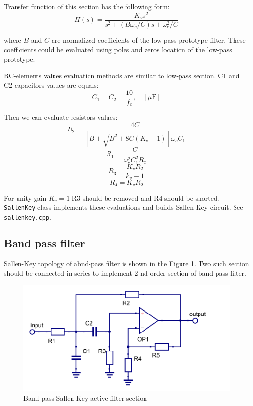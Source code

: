 Transfer function of this section has the following form:
\begin{equation}
 H(s)=\frac{K_vs^2}{s^2+(B\omega_c/C)s+\omega_c^2/C} \label{sk-hpf-trfunc}
\end{equation}

where $B$ and $C$ are normalized coefficients of the low-pass prototype filter.
These coefficients could be evaluated using poles and zeros location of the
low-pass prototype.

RC-elements values evaluation methods are similar to low-pass section. C1 and
C2 capacitors values are equals:
\begin{equation}
 C_1=C_2=\frac{10}{f_c}, \quad [\mu\mbox{F}]
\end{equation}

Then we can evaluate resistors values:
\begin{equation}
 R_2=\frac{4C}{[B+\sqrt{B^2+8C(K_v-1)}]\omega_cC_1}
\end{equation}
\begin{equation}
 R_1=\frac{C}{\omega_c^2C_1^2R_2}
\end{equation}
\begin{equation}
 R_3=\frac{K_vR_2}{k_v-1}
\end{equation}
\begin{equation}
 R_4=K_vR_2
\end{equation}


For unity gain $K_v=1$ R3 should be removed and R4 should be shorted.
\verb|SallenKey| class implements these evaluations and builds Sallen-Key
circuit. See \verb|sallenkey.cpp|.

\subsection{Band pass filter}

Sallen-Key topology of abnd-pass filter is shown in the Figure
\ref{fig:sk-bpf}. Two such section should be connected in series to implement
2-nd order section of band-pass filter.

\begin{figure}[!ht]
  \centering
  \includegraphics[width=0.6\linewidth]{pics/sk-bpf}
  \caption{Band pass Sallen-Key active filter section}
  \label{fig:sk-bpf}
\end{figure}

